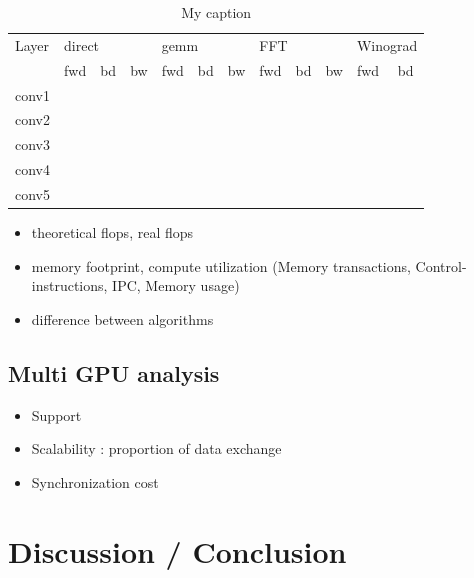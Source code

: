 \documentclass[conference]{IEEEtran}
\begin{document}
\begin{table}[]
\centering
\caption{My caption}
\label{my-label}
\begin{tabular}{llllllllllll}
Layer & \multicolumn{3}{l}{direct} & \multicolumn{3}{l}{gemm} & \multicolumn{3}{l}{FFT} & \multicolumn{2}{l}{Winograd} \\
      		& fwd      & bd     & bw     & fwd     & bd     & bw    & fwd     & bd    & bw    & fwd           & bd           \\
conv1 	&          &        &        &         &        &       &         &       &       &               &              \\
conv2 	&          &        &        &         &        &       &         &       &       &               &              \\
conv3 	&          &        &        &         &        &       &         &       &       &               &              \\
conv4 	&          &        &        &         &        &       &         &       &       &               &              \\
conv5 	&          &        &        &         &        &       &         &       &       &               &             
\end{tabular}
\end{table}

\begin{itemize}
  \item theoretical flops, real flops
  \item memory footprint, compute utilization (Memory transactions, Control-instructions, IPC, Memory usage)
  \item difference between algorithms
\end{itemize}

\subsection{Multi GPU analysis}

\begin{itemize}
  \item Support
  \item Scalability : proportion of data exchange
  \item Synchronization cost
\end{itemize}

\section{Discussion / Conclusion}
\end{document}
